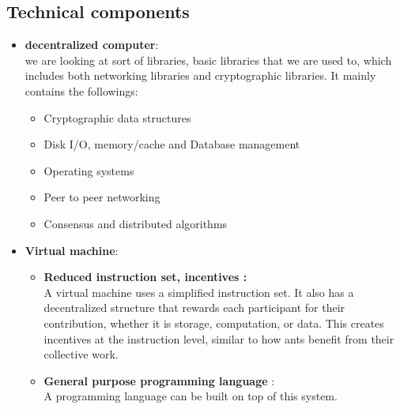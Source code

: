 \documentclass{report}
\begin{document}
\subsection*{Technical components}
\begin{itemize}
	\item \textbf{decentralized computer}:\\
	we are looking at sort of libraries, basic libraries that we are used to, which includes both networking libraries and cryptographic libraries. It mainly contains the followings:
	\begin{itemize}
		\item Cryptographic data structures
		\item Disk I/O, memory/cache and Database management
		\item Operating systems 
		\item Peer to peer networking
		\item Consensus and distributed algorithms
	\end{itemize}
	\item \textbf{Virtual machine}:
	\begin{itemize}
		\item \textbf{Reduced instruction set, incentives :} \\
		A virtual machine uses a simplified instruction set. It also has a decentralized structure that rewards each participant for their contribution, whether it is storage, computation, or data. This creates incentives at the instruction level, similar to how ants benefit from their collective work.
		\item \textbf{General purpose programming language} : \\
		A programming language can be built on top of this system.
	\end{itemize}
\end{itemize}
\end{document}
